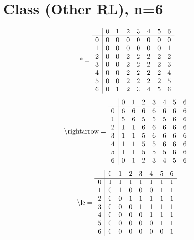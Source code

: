 \documentclass[11pt]{article}
\begin{document}
\section{Class (Other RL), n=6}
\[\text{*} = 
\begin{array}{r | r r r r r r r}
 & 0 & 1 & 2 & 3 & 4 & 5 & 6 \\ \hline
0 & 0 & 0 & 0 & 0 & 0 & 0 & 0 \\
1 & 0 & 0 & 0 & 0 & 0 & 0 & 1 \\
2 & 0 & 0 & 2 & 2 & 2 & 2 & 2 \\
3 & 0 & 0 & 2 & 2 & 2 & 2 & 3 \\
4 & 0 & 0 & 2 & 2 & 2 & 2 & 4 \\
5 & 0 & 0 & 2 & 2 & 2 & 2 & 5 \\
6 & 0 & 1 & 2 & 3 & 4 & 5 & 6 \\
\end{array}
\]
\[\text{\textbackslash rightarrow} = 
\begin{array}{r | r r r r r r r}
 & 0 & 1 & 2 & 3 & 4 & 5 & 6 \\ \hline
0 & 6 & 6 & 6 & 6 & 6 & 6 & 6 \\
1 & 5 & 6 & 5 & 5 & 5 & 6 & 6 \\
2 & 1 & 1 & 6 & 6 & 6 & 6 & 6 \\
3 & 1 & 1 & 5 & 6 & 6 & 6 & 6 \\
4 & 1 & 1 & 5 & 5 & 6 & 6 & 6 \\
5 & 1 & 1 & 5 & 5 & 5 & 6 & 6 \\
6 & 0 & 1 & 2 & 3 & 4 & 5 & 6 \\
\end{array}
\]
\[\text{\textbackslash le} = 
\begin{array}{r | r r r r r r r}
 & 0 & 1 & 2 & 3 & 4 & 5 & 6 \\ \hline
0 & 1 & 1 & 1 & 1 & 1 & 1 & 1 \\
1 & 0 & 1 & 0 & 0 & 0 & 1 & 1 \\
2 & 0 & 0 & 1 & 1 & 1 & 1 & 1 \\
3 & 0 & 0 & 0 & 1 & 1 & 1 & 1 \\
4 & 0 & 0 & 0 & 0 & 1 & 1 & 1 \\
5 & 0 & 0 & 0 & 0 & 0 & 1 & 1 \\
6 & 0 & 0 & 0 & 0 & 0 & 0 & 1 \\
\end{array}
\]
\end{document}
